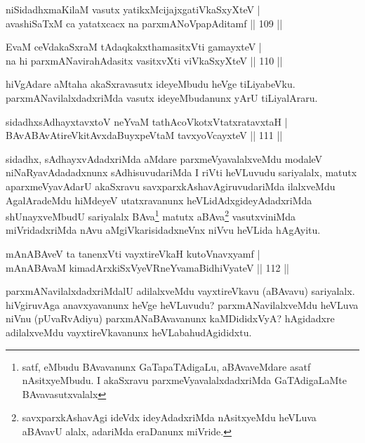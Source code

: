 \begin{shl}
niSidadhxmaKilaM vasutx yatikxMcijajxgatiVkaSxyXteV |\\
avashiSaTxM ca yatatxcacx na parxmANoVpapAditamf \hfill || 109 ||
\end{shl}

\begin{shl}
EvaM ceVdakaSxraM tAdaqkakxthamasitxVti gamayxteV |\\
na hi parxmANavirahAdasitx vasitxvXti viVkaSxyXteV \hfill || 110 ||
\end{shl}

\begin{artha}
hiVgAdare aMtaha akaSxravasutx ideyeMbudu heVge tiLiyabeVku. parxmANavilalxdadxriMda vasutx ideyeMbudanunx yArU tiLiyalAraru.
\end{artha}

\begin{shl}
sidadhxsAdhayxtavxtoV neYvaM tathAcoVkotxVtatxratavxtaH |\\
BAvABAvAtireVkitAvxdaBuyxpeVtaM tavxyoVcayxteV \hfill || 111 ||
\end{shl}

\begin{artha}
sidadhx, sAdhayxvAdadxriMda aMdare parxmeVyavalalxveMdu modaleV niNaRyavAdadadxnunx sAdhisuvudariMda I riVti heVLuvudu sariyalalx, matutx aparxmeVyavAdarU akaSxravu savxparxkAshavAgiruvudariMda ilalxveMdu AgalAradeMdu hiMdeyeV utatxravanunx heVLidAdxgideyAdadxriMda shUnayxveMbudU sariyalalx BAva\footnote[1]{satf, eMbudu BAvavanunx GaTapaTAdigaLu, aBAvaveMdare asatf nAsitxyeMbudu. I akaSxravu parxmeVyavalalxdadxriMda GaTAdigaLaMte BAvavasutxvalalx} matutx aBAva\footnote[2]{savxparxkAshavAgi ideVdx ideyAdadxriMda nAsitxyeMdu heVLuva aBAvavU alalx, adariMda eraDanunx miVride.} vasutxviniMda  miVridadxriMda nAvu aMgiVkarisidadxneVnx niVvu heVLida hAgAyitu.
\end{artha}%

\begin{shl}
mAnABAveV ta tanenxVti vayxtireVkaH kutoV\s navxyamf |\\
mAnABAvaM kimadArxkiSxVyeVRneYvamaBidhiVyateV \hfill || 112 ||
\end{shl}

\begin{artha}
parxmANavilalxdadxriMdalU adilalxveMdu vayxtireVkavu (aBAvavu) sariyalalx. hiVgiruvAga anavxyavanunx heVge heVLuvudu? parxmANavilalxveMdu heVLuva niVnu (pUvaRvAdiyu) parxmANaBAvavanunx kaMDididxVyA? hAgidadxre adilalxveMdu vayxtireVkavanunx heVLabahudAgididxtu.
\end{artha}

